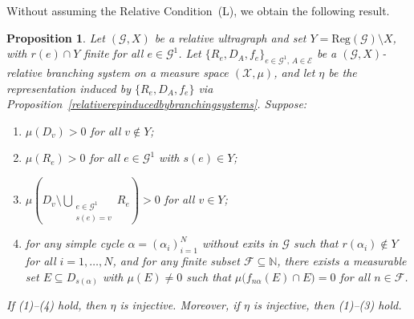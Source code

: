 \documentclass[12pt, reqno]{amsart}
\newtheorem{proposition}[theorem]{Proposition}
\theoremstyle{definition}
\theoremstyle{remark}
\numberwithin{equation}{section}
\begin{document}
   

Without assuming the Relative Condition~(L), we obtain the following result.

\begin{proposition}\label{injectivitybs}
Let $(\mathcal{G}, X)$ be a relative ultragraph and set $Y=\mathrm{Reg}(\mathcal{G})\setminus X$,
with $r(e)\cap Y$ finite for all $e \in \mathcal{G}^1$. Let
$\{R_e,D_A,f_e\}_{e\in \mathcal{G}^1,\, A\in \mathcal{E}}$ be a $(\mathcal{G}, X)$-relative
branching system on a measure space $(\mathcal{X},\mu)$, and let $\eta$ be the representation
induced by $\{R_e,D_A,f_e\}$ via Proposition~\ref{relativerepinducedbybranchingsystems}. Suppose:
\begin{enumerate}
    \item $\mu(D_v) > 0$ for all $v \notin Y$;
    \item $\mu(R_e) > 0$ for all $e \in \mathcal{G}^1$ with $s(e) \in Y$;
    \item $\mu\!\left( D_v \setminus \bigcup_{\substack{e \in \mathcal{G}^1\\ s(e)=v}} R_e \right) > 0$
          for all $v \in Y$;
    \item for any simple cycle $\alpha=(\alpha_i)_{i=1}^N$ without exits in $\mathcal{G}$ such that
          $r(\alpha_i) \notin Y$ for all $i=1,\ldots,N$, and for any finite subset
          $\mathcal{F}\subseteq\mathbb{N}$, there exists a measurable set
          $E \subseteq D_{s(\alpha)}$ with $\mu(E)\neq 0$ such that
          $\mu\!\bigl(f_{n\alpha}(E)\cap E\bigr)=0$ for all $n\in \mathcal{F}$.
\end{enumerate}
If {\rm(1)–(4)} hold, then $\eta$ is injective. Moreover, if $\eta$ is injective, then
{\rm(1)–(3)} hold.
\end{proposition}
\end{document}
